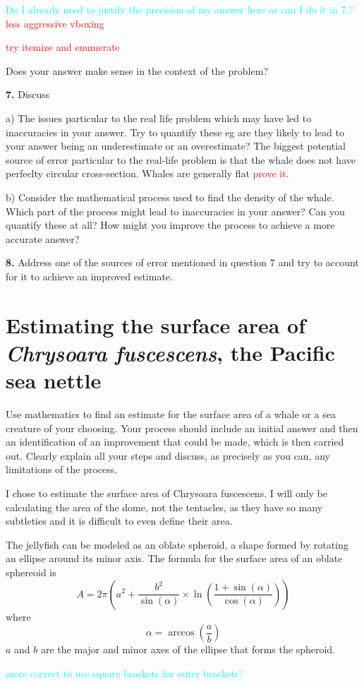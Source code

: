 \documentclass[fleqn]{article}
\newcommand\todo[1]{\textcolor{red}{#1}}
\newcommand\ask[1]{\textcolor{cyan}{#1}}
\newcommand\chry{\textit{Chrysoara fuscescens}}
\begin{document}
{  \ask{Do I already need to justify the precision of my answer here or can I do it in 7.?}
}
\todo{less aggressive vboxing}

\todo{try itemize and enumerate}

Does your answer make sense in the context of the problem?

\textbf{7.}	Discuss 

a) The issues particular to the real life problem which may have led to inaccuracies in your answer.  Try to quantify these eg are they likely to lead to your answer being an underestimate or an overestimate?
The biggest potential source of error particular to the real-life problem is that the whale does not have perfeclty circular cross-section. Whales are generally flat \todo{prove it}.

b) Consider the mathematical process used to find the density of the whale.  Which part of the process might lead to inaccuracies in your answer?  Can you quantify these at all?  How might you improve the process to achieve a more accurate answer?

\textbf{8.}	Address one of the sources of error mentioned in question 7 and try to account for it to achieve an improved estimate.


\section{Estimating the surface area of \chry, the Pacific sea nettle}

Use mathematics to find an estimate for the surface area of a whale or a sea creature of your choosing. Your process should include an initial answer and then an identification of an improvement that could be made, which is then carried out. Clearly explain all your steps and discuss, as precisely as you can, any limitations of the process.

I chose to estimate the surface area of Chrysoara fuscescens. I will only be calculating the area of the dome, not the tentacles, as they have so many subtleties and it is difficult to even define their area.

The jellyfish can be modeled as an oblate spheroid, a shape formed by rotating an ellipse around its minor axis. The formula for the surface area of an oblate sphereoid is
\begin{equation*}
  A = 2\pi\left(a^2+\frac{b^2}{\sin(\alpha)}\times\ln\left(\frac{1+\sin(\alpha)}{\cos(\alpha)}\right)\right)
\end{equation*}
where
\begin{equation*}
  \alpha=\arccos\left(\frac{a}{b}\right)
\end{equation*}
$a$ and $b$ are the major and minor axes of the ellipse that forms the spheroid.

\ask{more correct to use square brackets for outer brackets?}
\end{document}
